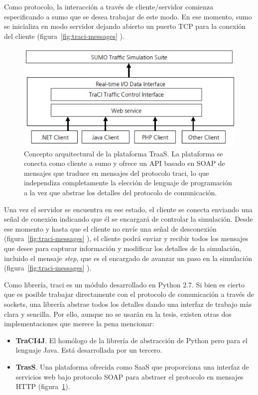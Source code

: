 Como protocolo, la interacción a través de cliente/servidor comienza especificando a \gls{sumo} que se desea trabajar de este modo. En ese momento, \gls{sumo} se inicializa en modo servidor dejando abierto un puerto TCP para la conexión del cliente (figura~\ref{fig:traci-messages} ).

\begin{figure}
	\centering
	\includegraphics{images/traas}
	\caption{Concepto arquitectural de la plataforma TraaS. La plataforma se conecta como cliente a \gls{sumo} y ofrece un API basado en SOAP de mensajes que traduce en mensajes del protocolo \gls{traci}, lo que independiza completamente la elección de lenguaje de programación a la vez que abstrae los detalles del protocolo de comunicación.}
	\label{fig:traas}
\end{figure}

Una vez el servidor se encuentra en ese estado, el cliente se conecta enviando una señal de conexión indicando que él se encargará de controlar la simulación. Desde ese momento y hasta que el cliente no envíe una señal de desconexión (figura~\ref{fig:traci-messages} ), el cliente podrá enviar y recibir todos los mensajes que desee para capturar información y modificar los detalles de la simulación, incluido el mensaje \textit{step}, que es el encargado de avanzar un paso en la simulación (figura~\ref{fig:traci-messages} ).

Como librería, \gls{traci} es un módulo desarrollado en \mbox{Python} $2$.$7$. Si bien es cierto que es posible trabajar directamente con el protocolo de comunicación a través de sockets, una librería abstrae todos los detalles dando una interfaz de trabajo más clara y sencilla. Por ello, aunque no se usarán en la tesis, existen otras dos implementaciones que merece la pena mencionar:

\begin{itemize}
	\item \textbf{TraCI4J}. El homólogo de la librería de abstracción de Python pero para el lenguaje Java. Está desarrollada por un tercero.
	\item \textbf{TrasS}. Una plataforma ofrecida como SaaS que proporciona una interfaz de servicios web bajo protocolo SOAP para abstraer el protocolo en mensajes HTTP (figura~\ref{fig:traas}).
\end{itemize}
